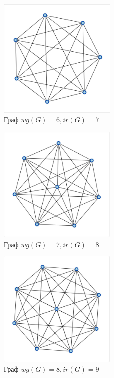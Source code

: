 \documentclass[bachelor, och, nir]{SCWorks}
\begin{document}
\begin{figure}[ht!]  
    \centering 
    \includegraphics[width=0.5\textwidth]
{6.jpeg}  
    \caption{Граф $wg(G) = 6, ir(G) = 7$} 
    \label{fig:im2} 
\end{figure}

\begin{figure}[ht!]  
    \centering 
    \includegraphics[width=0.5\textwidth]
{7.jpeg}  
    \caption{Граф $wg(G) = 7, ir(G) = 8$} 
    \label{fig:im2} 
\end{figure}

\begin{figure}[ht!]  
    \centering 
    \includegraphics[width=0.5\textwidth]
{99.jpg}  
    \caption{Граф $wg(G) = 8, ir(G) = 9$} 
    \label{fig:im2} 
\end{figure}
\end{document}
